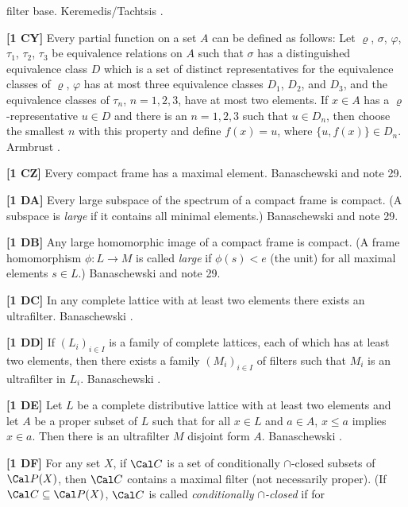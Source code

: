 filter base.  \ac{Keremedis/Tachtsis} \cite{2000}.
\smallskip
\item{}{\bf [1 CY]} Every partial function on a set $A$ can be
defined as follows: Let $\varrho$, $\sigma$, $\varphi$, $\tau_1$,
$\tau_2$, $\tau_3$ be equivalence relations on $A$ such that $\sigma$
has a distinguished equivalence class $D$ which is a set of distinct
representatives for the equivalence classes of $\varrho$, $\varphi$
has at most three equivalence classes $D_1$, $D_2$, and $D_3$, and
the equivalence classes of $\tau_n$, $n=1,2,3$, have at most two
elements. If $x\in A$ has a $\varrho$-representative $u\in D$ and
there is an $n=1,2,3$ such that $u\in D_n$, then choose the smallest $n$
with this property and define $f(x)=u$, where $\{u,f(x)\}\in D_n$.
\ac{Armbrust} \cite{1986}.
\smallskip
\item{}{\bf [1 CZ]} Every compact frame has a maximal element.
\ac{Banaschewski} \cite{1990} and note 29.
\smallskip
\item{}{\bf [1 DA]} Every large subspace of the spectrum of a
compact frame is compact. (A subspace is {\it large} if it contains
all minimal elements.) \ac{Banaschewski} \cite{1990} and note 29.
\smallskip
\item{}{\bf [1 DB]} Any large homomorphic image of a compact frame
is compact.  (A frame homomorphism $\phi: L\to M$ is called
{\it large} if $\phi(s) < e$ (the unit) for all maximal elements
$s\in L$.) \ac{Banaschewski} \cite{1990} and note 29.
\smallskip
\item{}{\bf [1 DC]} In any complete lattice with at least two elements
there exists an ultrafilter. \ac{Banaschewski} \cite{1961}.
\smallskip
\item{}{\bf [1 DD]} If $(L_i)_{i\in I}$ is a family of complete
lattices, each of which has at least two elements, then there exists
a family $(M_i)_{i\in I}$ of filters such that $M_i$ is an
ultrafilter in $L_i$.  \ac{Banaschewski} \cite{1961}.
\smallskip
\item{}{\bf [1 DE]} Let $L$ be a complete distributive lattice with
at least two elements and let $A$ be a proper subset of $L$ such that
for all $x\in L$ and $a\in A$, $x\le a$ implies $x\in a$. Then there
is an ultrafilter $M$ disjoint form $A$. \ac{Banaschewski} \cite{1961}.
\smallskip
\item{}{\bf [1 DF]} For any set $X$, if $\Cal C$ is a set of
conditionally $\cap$-closed subsets of $\Cal P(X)$, then $\Cal C$
contains a maximal filter (not necessarily proper). (If $\Cal C\subseteq
\Cal P(X)$, $\Cal C$ is called {\it conditionally $\cap$-closed} if for
